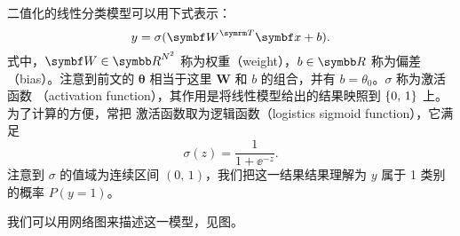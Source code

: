 二值化的线性分类模型可以用下式表示：
\begin{equation}
  y = \sigma(\bm{W}^\trans \bm{x} + b).
\end{equation}
式中，$\bm{W}\in\R^{N^2}$ 称为权重（weight），$b\in\R$ 称为偏差（bias）。注意到前文的
$\bm{\theta}$ 相当于这里 $\bm{W}$ 和 $b$ 的组合，并有 $b=\theta_0$。$\sigma$ 称为激活函数
（activation function），其作用是将线性模型给出的结果映照到 ${\{0,\,1\}}$ 上。为了计算的方便，常把
激活函数取为逻辑函数（logistics sigmoid function），它满足
\begin{equation}
  \sigma(z) = \frac{1}{1+\ee^{-z}}.
\end{equation}
注意到 $\sigma$ 的值域为连续区间 $(0,\,1)$，我们把这一结果结果理解为 $y$ 属于 1 类别的概率
$P(y=1)$。

我们可以用网络图来描述这一模型，见图。

